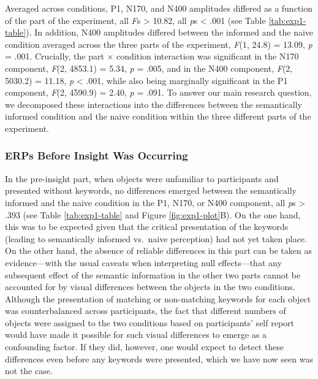 \documentclass[
  english,
  doc,12pt,twoside,floatsintext]{apa7}
\begin{document}
Averaged across conditions, P1, N170, and N400 amplitudes differed as a function of the part of the experiment, all \emph{F}s \textgreater{} 10.82, all \emph{p}s \textless{} .001 (see Table \ref{tab:exp1-table}). In addition, N400 amplitudes differed between the informed and the naive condition averaged across the three parts of the experiment, \emph{F}(1, 24.8) = 13.09, \emph{p} = .001. Crucially, the part × condition interaction was significant in the N170 component, \emph{F}(2, 4853.1) = 5.34, \emph{p} = .005, and in the N400 component, \emph{F}(2, 5030.2) = 11.18, \emph{p} \textless{} .001, while also being marginally significant in the P1 component, \emph{F}(2, 4590.9) = 2.40, \emph{p} = .091. To answer our main research question, we decomposed these interactions into the differences between the semantically informed condition and the naive condition within the three different parts of the experiment.

\hypertarget{erps-before-insight-was-occurring}{%
\subsubsection{ERPs Before Insight Was Occurring}\label{erps-before-insight-was-occurring}}

In the pre-insight part, when objects were unfamiliar to participants and presented without keywords, no differences emerged between the semantically informed and the naive condition in the P1, N170, or N400 component, all \emph{p}s \textgreater{} .393 (see Table \ref{tab:exp1-table} and Figure \ref{fig:exp1-plot}B). On the one hand, this was to be expected given that the critical presentation of the keywords (leading to semantically informed vs.~naive perception) had not yet taken place. On the other hand, the absence of reliable differences in this part can be taken as evidence---with the usual caveats when interpreting null effects---that any subsequent effect of the semantic information in the other two parts cannot be accounted for by visual differences between the objects in the two conditions. Although the presentation of matching or non-matching keywords for each object was counterbalanced across participants, the fact that different numbers of objects were assigned to the two conditions based on participants' self report would have made it possible for such visual differences to emerge as a confounding factor. If they did, however, one would expect to detect these differences even before any keywords were presented, which we have now seen was not the case.
\end{document}
